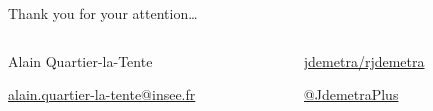 \documentclass[10pt,xcolor=table,color={dvipsnames,usenames},ignorenonframetext,usepdftitle=false,french]{beamer}
\begin{document}
\begin{frame}{Thank you for your attention\ldots{}}
\bigskip
\bigskip

\begin{columns}
\begin{column}{0.5\textwidth}
Alain Quartier-la-Tente


\href{mailto:alain.quartier-la-tente@insee.fr}{\faEnvelope{} alain.quartier-la-tente@insee.fr} 
\end{column}
\begin{column}{0.5\textwidth} 
\href{https://github.com/jdemetra/rjdemetra}{\faGithub{} jdemetra/rjdemetra}  

\href{https://twitter.com/JDemetraPlus}{\faTwitter{} @JdemetraPlus}

\end{column}
\end{columns}

\end{frame}
\end{document}

